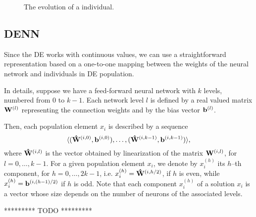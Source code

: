 \begin{figure}
\caption{The evolution of a individual.}
\label{fig:genomalife}
\end{figure}

\subsection{DENN}
Since the DE works with continuous values, we can use  
a straightforward representation based on a one-to-one mapping between the weights of the neural network and 
individuals in DE population.

In details, suppose we have a feed-forward neural network with $k$ levels, numbered from $0$ to $k-1$.
Each network level $l$ is defined by a  real valued matrix ${\bf W}^{(l)}$ representing the connection weights and by the bias vector ${\bf b}^{(l)}$. 

Then, each population element $x_i$ is described by a sequence 
$$\langle ({\bf \hat W}^{(i,0)},{\bf b}^{(i,0)}),\dots,({\bf \hat W}^{(i,k-1)},{\bf b}^{(i,k-1)})\rangle,$$
where ${\bf \hat W}^{(i,l)}$ is the vector obtained by linearization of the matrix ${\bf W}^{(i,l)}$, for $l=0,\dots,k-1$.
For a given population element $x_i$, we denote by $x_i^{(h)}$ its $h$--th component, for $h=0,\dots,2k-1$, i.e.
$x_i^{(h)}={\bf \hat W}^{(i,h/2)}$, if $h$ is even, while $x_i^{(h)}={\bf b}^{(i,(h-1)/2)}$ if $h$ is odd.
Note that each component $x_i^{(h)}$ of a solution $x_i$ is a vector whose size depends on the number of neurons of
the associated levels.

*********
TODO
*********
